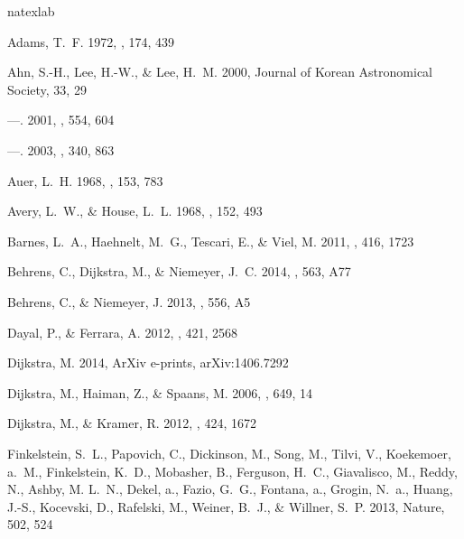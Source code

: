 \documentclass{emulateapj}
\begin{document}

% 
\begin{thebibliography}{38}
\expandafter\ifx\csname natexlab\endcsname\relax\def\natexlab#1{#1}\fi

{Adams}, T.~F. 1972, \apj, 174, 439

{Ahn}, S.-H., {Lee}, H.-W., \& {Lee}, H.~M. 2000, Journal of Korean
  Astronomical Society, 33, 29

---. 2001, \apj, 554, 604

---. 2003, \mnras, 340, 863

{Auer}, L.~H. 1968, \apj, 153, 783

{Avery}, L.~W., \& {House}, L.~L. 1968, \apj, 152, 493

{Barnes}, L.~A., {Haehnelt}, M.~G., {Tescari}, E., \& {Viel}, M. 2011, \mnras,
  416, 1723

{Behrens}, C., {Dijkstra}, M., \& {Niemeyer}, J.~C. 2014, \aap, 563, A77

{Behrens}, C., \& {Niemeyer}, J. 2013, \aap, 556, A5

{Dayal}, P., \& {Ferrara}, A. 2012, \mnras, 421, 2568

{Dijkstra}, M. 2014, ArXiv e-prints, arXiv:1406.7292

{Dijkstra}, M., {Haiman}, Z., \& {Spaans}, M. 2006, \apj, 649, 14

{Dijkstra}, M., \& {Kramer}, R. 2012, \mnras, 424, 1672

Finkelstein, S.~L., Papovich, C., Dickinson, M., Song, M., Tilvi, V.,
  Koekemoer, a.~M., Finkelstein, K.~D., Mobasher, B., Ferguson, H.~C.,
  Giavalisco, M., Reddy, N., Ashby, M. L.~N., Dekel, a., Fazio, G.~G., Fontana,
  a., Grogin, N.~a., Huang, J.-S., Kocevski, D., Rafelski, M., Weiner, B.~J.,
  \& Willner, S.~P. 2013, Nature, 502, 524


\end{thebibliography}
\end{document}
